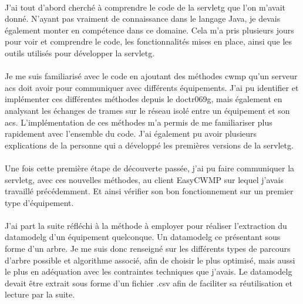 \documentclass[12pt,a4paper]{report}
\begin{document}
\paragraph*{}J’ai tout d’abord cherché à comprendre le code de la \gls{servletg} que l’on m’avait donné. N’ayant pas vraiment de connaissance dans le langage Java, je devais également monter en compétence dans ce domaine. Cela m’a pris plusieurs jours pour voir et comprendre le code, les fonctionnalités mises en place, ainsi que les outils utilisés pour développer la \gls{servletg}.
\paragraph*{}Je me suis familiarisé avec le code en ajoutant des méthodes \gls{cwmp} qu’un serveur \gls{acs} doit avoir pour communiquer avec différents équipements. J’ai pu identifier et implémenter ces différentes méthodes depuis le \gls{doctr069g}, mais également en analysant les échanges de trames sur le réseau isolé entre un équipement et son \gls{acs}. L’implémentation de ces méthodes m’a permis de me familiariser plus rapidement avec l’ensemble du code. J’ai également pu avoir plusieurs explications de la personne qui a développé les premières versions de la \gls{servletg}.
\paragraph*{}Une fois cette première étape de découverte passée, j’ai pu faire communiquer la \gls{servletg}, avec ces nouvelles méthodes, au client EasyCWMP sur lequel j’avais travaillé précédemment. Et ainsi vérifier son bon fonctionnement sur un premier type d’équipement.
\paragraph*{}J’ai part la suite réfléchi à la méthode à employer pour réaliser l’extraction du \gls{datamodelg} d’un équipement quelconque. Un \gls{datamodelg} ce présentant sous forme d’un arbre. Je me suis donc renseigné sur les différents types de parcours d’arbre possible et algorithme associé, afin de choisir le plus optimisé, mais aussi le plus en adéquation avec les contraintes techniques que j’avais. Le \gls{datamodelg} devait être extrait sous forme d’un fichier .csv afin de faciliter sa réutilisation et lecture par la suite.
\end{document}
